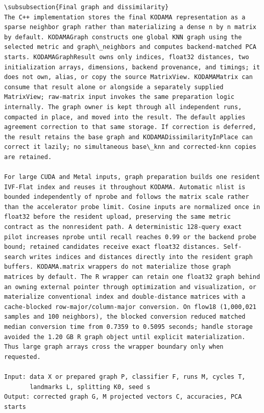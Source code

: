 \documentclass[twoside,11pt]{article}
\begin{document}
\begin{small}
\begin{verbatim}
\subsubsection{Final graph and dissimilarity}
The C++ implementation stores the final KODAMA representation as a sparse neighbor graph rather than materializing a dense n by n matrix by default. KODAMAGraph constructs one global KNN graph using the selected metric and graph\_neighbors and computes backend-matched PCA starts. KODAMAGraphResult owns only indices, float32 distances, two initialization arrays, dimensions, backend provenance, and timings; it does not own, alias, or copy the source MatrixView. KODAMAMatrix can consume that result alone or alongside a separately supplied MatrixView; raw-matrix input invokes the same preparation logic internally. The graph owner is kept through all independent runs, compacted in place, and moved into the result. The default applies agreement correction to that same storage. If correction is deferred, the result retains the base graph and KODAMADissimilarityInPlace can correct it lazily; no simultaneous base\_knn and corrected-knn copies are retained.

For large CUDA and Metal inputs, graph preparation builds one resident IVF-Flat index and reuses it throughout KODAMA. Automatic nlist is bounded independently of nprobe and follows the matrix scale rather than the accelerator probe limit. Cosine inputs are normalized once in float32 before the resident upload, preserving the same metric contract as the nonresident path. A deterministic 128-query exact pilot increases nprobe until recall reaches 0.99 or the backend probe bound; retained candidates receive exact float32 distances. Self-search writes indices and distances directly into the resident graph buffers. KODAMA.matrix wrappers do not materialize those graph matrices by default. The R wrapper can retain one float32 graph behind an owning external pointer through optimization and visualization, or materialize conventional index and double-distance matrices with a cache-blocked row-major/column-major conversion. On flow18 (1,000,021 samples and 100 neighbors), the blocked conversion reduced matched median conversion time from 0.7359 to 0.5095 seconds; handle storage avoided the 1.20 GB R graph object until explicit materialization. Thus large graph arrays cross the wrapper boundary only when requested.

Input: data X or prepared graph P, classifier F, runs M, cycles T,
       landmarks L, splitting K0, seed s
Output: corrected graph G, M projected vectors C, accuracies, PCA starts


\end{verbatim}
\end{small}
\end{document}
